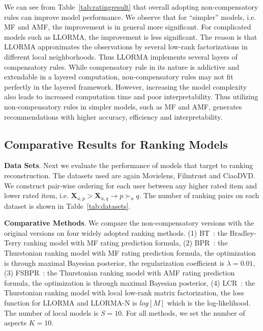 \documentclass[letterpaper]{article} %
\newcommand{\Rating}{\mathbf{X}}
\begin{document}
We can see from Table~\ref{tab:ratingresult} that overall adopting non-compensatory rules can improve model performance. We observe that for ``simpler'' models, i.e. MF and AMF,  the improvement is in general more significant. For complicated models such as LLORMA, the improvement is less significant. The reason is that LLORMA approximates the observations by several low-rank factorizations in different local neighborhoods.  Thus LLORMA implements several layers of compensatory rules. While compensatory rule in its nature is addictive and extendable in a layered computation, non-compensatory rules may not fit perfectly in the layered framework. However, increasing the model complexity also leads to increased computation time and poor interpretability. Thus utilizing non-compensatory rules in simpler models, such as MF and AMF, generates recommendations with higher accuracy, efficiency and interpretability. 


\subsection{Comparative Results for Ranking Models}

\textbf{Data Sets}. Next we evaluate the performance of models that target to ranking reconstruction. The datasets used are again Movielens, Filmtrust and CiaoDVD. We construct pair-wise ordering for each user between any higher rated item and lower rated item, i.e. $\Rating_{u,p}>\Rating_{u,q}\rightarrow p\succ_u q$. The number of ranking pairs on each dataset is shown in Table~\ref{tab:datasets}.

\textbf{Comparative Methods}. We compare the non-compensatory versions with the original versions on four widely adopted ranking methods. (1) BT~\cite{Hu2016Improved}: the Bradley-Terry ranking model with MF rating prediction formula, (2) BPR~\cite{Rendle2009BPR}:  the Thurstonian ranking model with MF rating prediction formula, the optimization is through maximal Bayesian posterior, the regularization coefficient is $\lambda=0.01$, (3) FSBPR~\cite{Zhao2018Factored}: the Thurstonian ranking model with AMF rating prediction formula, the optimization is through maximal Bayesian posterior, (4) LCR~\cite{Lee2014Local}: the Thurstonian ranking model with local low-rank matrix factorization, the loss function for LLORMA and LLORMA-N is $log[M]$ which is the log-likelihood. The number of local models  is $S=10$.  For all methods, we set the number of aspects $K=10$. 
\end{document}
